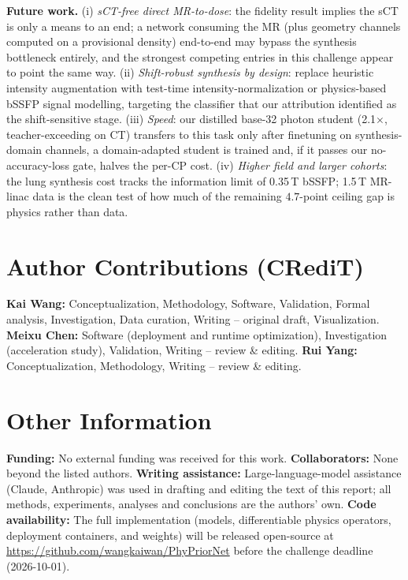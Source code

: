 \documentclass{llncs}
\begin{document}
\textbf{Future work.} (i) \emph{sCT-free direct MR-to-dose}: the fidelity result implies the
sCT is only a means to an end; a network consuming the MR (plus geometry channels computed on a
provisional density) end-to-end may bypass the synthesis bottleneck entirely, and the strongest
competing entries in this challenge appear to point the same way. (ii) \emph{Shift-robust
synthesis by design}: replace heuristic intensity augmentation with test-time
intensity-normalization or physics-based bSSFP signal modelling, targeting the classifier that
our attribution identified as the shift-sensitive stage. (iii) \emph{Speed}: our distilled
base-32 photon student (2.1$\times$, teacher-exceeding on CT) transfers to this task only after
finetuning on synthesis-domain channels, a domain-adapted student is trained and, if it passes
our no-accuracy-loss gate, halves the per-CP cost. (iv) \emph{Higher field and larger
cohorts}: the lung synthesis cost tracks the information limit of 0.35\,T bSSFP; 1.5\,T
MR-linac data is the clean test of how much of the remaining $4.7$-point ceiling gap is
physics rather than data.

\section{Author Contributions (CRediT)}
\textbf{Kai Wang:} Conceptualization, Methodology, Software, Validation, Formal analysis,
Investigation, Data curation, Writing -- original draft, Visualization.
\textbf{Meixu Chen:} Software (deployment and runtime optimization), Investigation
(acceleration study), Validation, Writing -- review \& editing.
\textbf{Rui Yang:} Conceptualization, Methodology, Writing -- review \& editing.

\section{Other Information}
\textbf{Funding:} No external funding was received for this work.
\textbf{Collaborators:} None beyond the listed authors.
\textbf{Writing assistance:} Large-language-model assistance (Claude, Anthropic) was used in drafting and editing the text of this report; all methods, experiments, analyses and conclusions are the authors' own.
\textbf{Code availability:} The full implementation (models, differentiable physics operators,
deployment containers, and weights) will be released open-source at
\url{https://github.com/wangkaiwan/PhyPriorNet} before the challenge deadline (2026-10-01).
\end{document}
